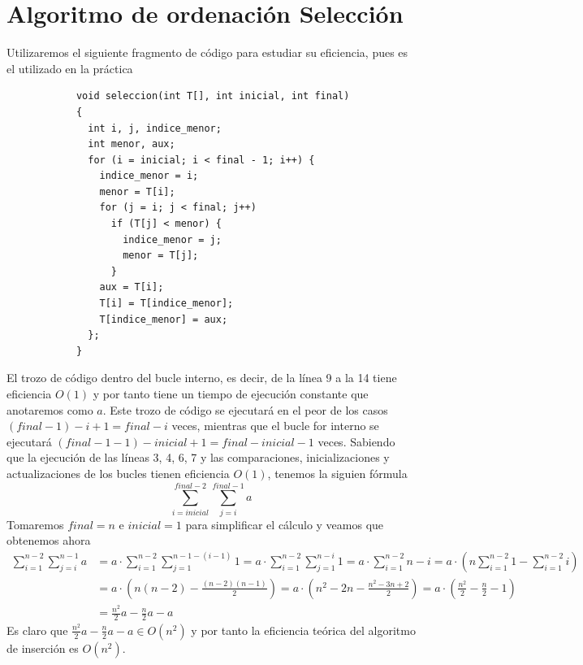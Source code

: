 \documentclass[11pt,openany]{book}
\begin{document}
\section*{Algoritmo de ordenación Selección}
Utilizaremos el siguiente fragmento de código para estudiar su eficiencia, pues es el utilizado en la práctica
\begin{lstlisting}
            void seleccion(int T[], int inicial, int final)
            {
              int i, j, indice_menor;
              int menor, aux;
              for (i = inicial; i < final - 1; i++) {
                indice_menor = i;
                menor = T[i];
                for (j = i; j < final; j++)
                  if (T[j] < menor) {
                    indice_menor = j;
                    menor = T[j];
                  }
                aux = T[i];
                T[i] = T[indice_menor];
                T[indice_menor] = aux;
              };
            }
        \end{lstlisting}
El trozo de código dentro del bucle interno, es decir, de la línea 9 a la 14 tiene eficiencia $O(1)$ y por tanto
tiene un tiempo de ejecución constante que anotaremos como $a$. Este trozo de código se ejecutará en el peor de los casos
$(final-1)-i+1=final-i$ veces, mientras que el bucle for interno se ejecutará $(final-1-1)-inicial+1=final -inicial-1$ veces.
Sabiendo que la ejecución de las líneas 3, 4, 6, 7 y las comparaciones, inicializaciones y actualizaciones de los
bucles tienen eficiencia $O(1)$, tenemos la siguien fórmula
\begin{equation*}
    \sum_{i=inicial}^{final-2} \sum_{j=i}^{final-1}a
\end{equation*}
Tomaremos $final =  n$ e $inicial = 1$ para simplificar el cálculo y veamos que obtenemos ahora
\begin{equation*}\begin{split}
        \sum_{i=1}^{n-2} \sum_{j=i}^{n-1}a&= a \cdot \sum_{i=1}^{n-2} \sum_{j=1}^{n-1-(i-1)}1
        = a \cdot \sum_{i=1}^{n-2} \sum_{j=1}^{n-i}1=a \cdot \sum_{i=1}^{n-2} n-i= a \cdot (n\sum_{i=1}^{n-2}1 - \sum_{i=1}^{n-2}i) \\
        & = a \cdot\left(n(n-2)-\frac{(n-2)(n-1)}{2}\right)= a \cdot \left(n^2-2n-\frac{n^2-3n+2}{2}\right)= a \cdot \left(\frac{n^2}{2}-\frac{n}{2}-1\right) \\
        & = \frac{n^2}{2}a-\frac{n}{2}a-a
    \end{split}\end{equation*}
Es claro que $\frac{n^2}{2}a-\frac{n}{2}a-a \in O(n^2)$ y por tanto la eficiencia teórica del algoritmo de inserción es $O(n^2)$.
\end{document}
